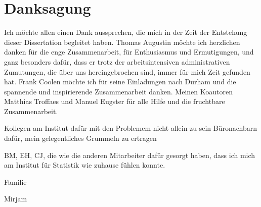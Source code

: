 

\chapter*{Danksagung}

Ich möchte allen einen Dank aussprechen,
die mich in der Zeit der Entstehung dieser Dissertation begleitet haben.
%
Thomas Augustin möchte ich herzlichen danken für die enge Zusammenarbeit,
für Enthusiasmus und Ermutigungen, und ganz besonders dafür, dass er
trotz der arbeitsintensiven administrativen Zumutungen, die über uns hereingebrochen sind,
immer für mich Zeit gefunden hat.
%
Frank Coolen möchte ich für seine Einladungen nach Durham und die spannende und inspirierende Zusammenarbeit danken.
%
Meinen Koautoren Matthias Troffaes und Manuel Eugster für alle Hilfe und die fruchtbare Zusammenarbeit.

Kollegen am Institut dafür mit den Problemem nicht allein zu sein
Büronachbarn dafür, mein gelegentliches Grummeln zu ertragen

BM, EH, CJ, die wie die anderen Mitarbeiter dafür gesorgt haben,
dass ich mich am Institut für Statistik wie zuhause fühlen konnte.

Familie

Mirjam
